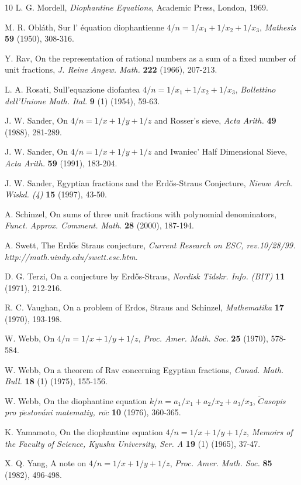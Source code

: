\documentclass[10pt]{article}
\theoremstyle{definition}
\begin{document}
\begin{thebibliography}{10}
L. G. Mordell, {\it Diophantine Equations},  Academic Press, London, 1969.

 M. R. Obl\'{a}th, Sur l' \'{e}quation diophantienne $4 \slash n = 1 \slash x_{1} + 1 \slash x_{2} + 1 \slash x_{3}$, {\it Mathesis} {\bf 59} (1950), 308-316.

 Y. Rav, On the representation of rational numbers as a sum of a fixed number of unit fractions, {\it J. Reine Angew. Math.} {\bf 222} (1966), 207-213.

 L. A. Rosati, Sull'equazione diofantea $4/n=1/x_1+1/x_2+1/x_3$, {\it Bollettino dell'Unione Math. Ital.} {\bf 9} (1) (1954), 59-63.

 J. W. Sander, On $4 \slash n = 1 \slash x + 1 \slash y + 1 \slash z$  and Rosser's sieve, {\it Acta Arith.} {\bf 49} (1988), 281-289.

 J. W. Sander, On $4 \slash n = 1 \slash x + 1 \slash y + 1 \slash z$  and Iwaniec' Half Dimensional Sieve, {\it Acta Arith.} {\bf 59} (1991), 183-204.

 J. W. Sander, Egyptian fractions and the Erd\H{o}s-Straus Conjecture,  {\it Nieuw Arch. Wiskd. (4)} {\bf 15} (1997), 43-50.

 A. Schinzel, On sums of three unit fractions with polynomial denominators, {\it Funct. Approx. Comment. Math.} {\bf 28} (2000), 187-194.

 A. Swett, The Erd\H{o}s Straus conjecture, {\it Current Research on ESC, rev.10/28/99.  http://math.uindy.edu/swett.esc.htm}.

 D. G. Terzi, On a conjecture by Erd\H{o}s-Straus,  {\it Nordisk Tidskr. Info. (BIT)} {\bf 11} (1971), 212-216.

 R. C. Vaughan, On a problem of Erdos, Straus and Schinzel, {\it Mathematika} {\bf 17} (1970), 193-198.

 W. Webb, On $4 \slash n = 1 \slash x + 1 \slash y + 1 \slash z$, {\it Proc. Amer. Math. Soc.} {\bf 25} (1970), 578-584.

 W. Webb, On a theorem of Rav concerning Egyptian fractions, {\it Canad. Math. Bull.} {\bf 18} (1) (1975), 155-156.

 W. Webb, On the diophantine equation $k \slash n = a_{1} \slash x_{1} + a_{2} \slash x_{2} + a_{3} \slash x_{3}$, {\it $\breve{C}$asopis pro p$\breve{e}$stov\'{a}ni matematiy, ro$\breve{c}$} {\bf 10} (1976), 360-365.

 K. Yamamoto, On the diophantine equation $4 \slash n = 1 \slash x + 1 \slash y + 1 \slash z$, {\it Memoirs of the Faculty of Science, Kyushu University, Ser. A} {\bf 19} (1) (1965), 37-47.

 X. Q. Yang, A note on $4 \slash n = 1 \slash x + 1 \slash y + 1 \slash z$, {\it Proc. Amer. Math. Soc.} {\bf 85} (1982), 496-498.

\end{thebibliography}
\end{document}
